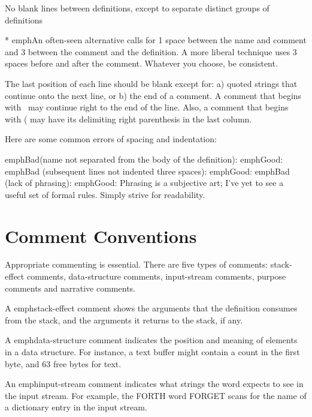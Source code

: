 No blank lines between definitions, except to separate distinct groups of
definitions


* emph{An often-seen alternative calls for 1 space between the name and comment and 3
between the comment and the definition.  A more liberal technique uses 3 spaces
before and after the comment.  Whatever you choose, be consistent.}

The last position of each line should be blank except for:
a) quoted strings that continue onto the next line, or
b) the end of a comment.
A comment that begins with \ may continue right to the end of the line.
Also, a comment that begins with ( may have its delimiting right parenthesis
in the last column.

Here are some common errors of spacing and indentation:

emph{Bad}(name not separated from the body of the definition):
emph{Good:}
emph{Bad} (subsequent lines not indented three spaces):
emph{Good:}
emph{Bad} (lack of phrasing):
emph{Good:}
Phrasing is a subjective art; I've yet to see a useful set of formal rules.
Simply strive for readability.

\section{Comment Conventions}

Appropriate commenting is essential.  There are five types of comments:
stack-effect comments, data-structure comments, input-stream comments,
purpose comments and narrative comments.

A emph{stack-effect comment} shows the arguments that the definition
consumes from the stack, and the arguments it returns to the stack, if
any.

A emph{data-structure comment} indicates the position and meaning of elements
in a data structure.  For instance, a text buffer might contain a
count in the first byte, and 63 free bytes for text.

An emph{input-stream comment} indicates what strings the word expects
to see in the input stream.  For example, the FORTH word FORGET
scans for the name of a dictionary entry in the input stream.


